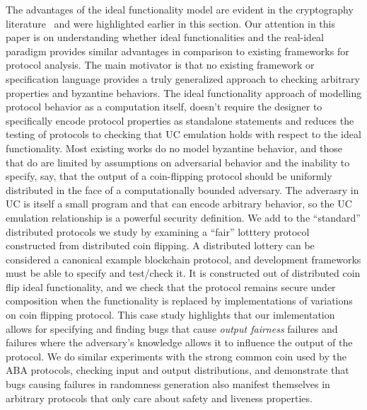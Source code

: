 The advantages of the ideal functionality model are evident in the cryptography
literature~\cite{people, praising, it} and were highlighted earlier in this
section.  Our attention in this paper is on understanding whether ideal
functionalities and the real-ideal paradigm provides similar advantages in
comparison to existing frameworks for protocol analysis.  The main motivator is
that no existing framework or specification language provides a truly
generalized approach to checking arbitrary properties and byzantine behaviors.
The ideal functionality approach of modelling protocol behavior as a
computation itself, doesn't require the designer to specifically encode
protocol properties as standalone statements and reduces the testing of
protocols to checking that UC emulation holds with respect to the ideal
functionality.  Most existing works do no model byzantine behavior, and those
that do are limited by assumptions on adversarial behavior and the inability to
specify, say, that the output of a coin-flipping protocol should be uniformly
distributed in the face of a computationally bounded adversary.  The adverasry
in UC is itself a small program and that can encode arbitrary behavior, so the
UC emulation relationship is a powerful security definition.  We add to the
``standard'' distributed protocols we study by examining a ``fair'' lotttery
protocol constructed from distributed coin flipping.  A distributed lottery can
be considered a canonical example blockchain protocol, and development
frameworks must be able to specify and test/check it.  It is constructed out of
distributed coin flip ideal functionality, and we check that the protocol
remains secure under composition when the functionality is replaced by
implementations of variations on coin flipping protocol.  This case study
highlights that our imlementation allows for specifying and finding bugs that
cause \emph{output fairness} failures and failures where the adversary's
knowledge allows it to influence the output of the protocol.  We do similar
experiments with the strong common coin used by the ABA protocols, checking
input and output distributions, and demonstrate that bugs causing failures in
randomness generation also manifest themselves in arbitrary protocols that only
care about safety and liveness properties.

